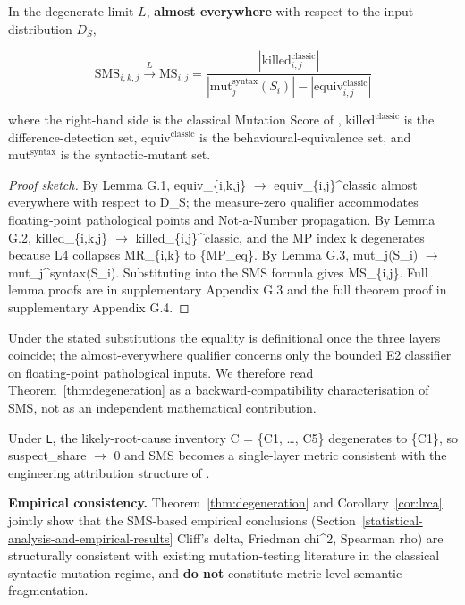 \documentclass[manuscript,screen,review]{acmart}
\begin{document}
\begin{theorem}\label{thm:degeneration}
In the degenerate limit
$L$, \textbf{almost everywhere} with respect to the input
distribution $D_S$,

\[ \mathrm{SMS}_{i,k,j} \xrightarrow{L} \mathrm{MS}_{i,j} = \frac{|\mathrm{killed}_{i,j}^{\mathrm{classic}}|}{|\mathrm{mut}_j^{\mathrm{syntax}}(S_i)| - |\mathrm{equiv}_{i,j}^{\mathrm{classic}}|} \]

where the right-hand side is the classical Mutation Score of
\citet{jia2011analysis},
$\mathrm{killed}^{\mathrm{classic}}$ is the difference-detection set,
$\mathrm{equiv}^{\mathrm{classic}}$ is the behavioural-equivalence set,
and $\mathrm{mut}^{\mathrm{syntax}}$ is the syntactic-mutant set.
\end{theorem}

\begin{proof}[Proof sketch]
By Lemma G.1, equiv\_\{i,k,j\} $\to$
equiv\_\{i,j\}\^{}classic almost everywhere with respect to D\_S; the
measure-zero qualifier accommodates floating-point pathological points
and Not-a-Number propagation. By Lemma G.2, killed\_\{i,k,j\} $\to$
killed\_\{i,j\}\^{}classic, and the MP index k degenerates because L4
collapses MR\_\{i,k\} to \{MP\_eq\}. By Lemma G.3, mut\_j(S\_i) $\to$
mut\_j\^{}syntax(S\_i). Substituting into the SMS formula gives
MS\_\{i,j\}. Full lemma proofs are in supplementary Appendix G.3 and the
full theorem proof in supplementary Appendix G.4.
\end{proof}

Under the stated substitutions the equality is definitional once the
three layers coincide; the almost-everywhere qualifier concerns only
the bounded E2 classifier on floating-point pathological inputs. We
therefore read Theorem~\ref{thm:degeneration} as a
backward-compatibility characterisation of SMS, not as an independent
mathematical contribution.

\begin{corollary}\label{cor:lrca}
Under \texttt{L}, the
likely-root-cause inventory C = \{C1, \ldots, C5\} degenerates to
\{C1\}, so suspect\_share $\to$ 0 and SMS becomes a single-layer metric
consistent with the engineering attribution structure of
\citet{jia2011analysis}.
\end{corollary}

\textbf{Empirical consistency.} Theorem~\ref{thm:degeneration} and
Corollary~\ref{cor:lrca} jointly
show that the SMS-based empirical conclusions (Section~\ref{statistical-analysis-and-empirical-results} Cliff's delta,
Friedman chi\^{}2, Spearman rho) are structurally consistent with
existing mutation-testing literature in the classical syntactic-mutation
regime, and \textbf{do not} constitute metric-level semantic
fragmentation.
\end{document}
